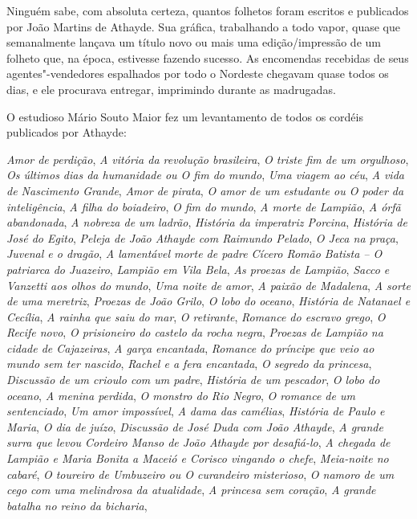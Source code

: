 Ninguém sabe, com absoluta certeza, quantos folhetos
foram escritos e publicados por João Martins de Athayde.
Sua gráfica, trabalhando a todo vapor, quase que
semanalmente lançava um título novo ou mais uma
edição/impressão de um folheto que, na época, estivesse
fazendo sucesso. As encomendas recebidas de seus agentes"-vendedores espalhados por todo o Nordeste chegavam quase todos os dias, e ele procurava entregar, imprimindo
durante as madrugadas.

O estudioso Mário Souto Maior fez um levantamento de todos os cordéis publicados por Athayde:

\textit{Amor de perdição}, \textit{A vitória da revolução brasileira}, \textit{O triste
fim de um orgulhoso}, \textit{Os últimos dias da humanidade ou O
fim do mundo}, \textit{Uma viagem ao céu}, \textit{A vida de Nascimento
Grande}, \textit{Amor de pirata}, \textit{O amor de um estudante ou O poder
da inteligência}, \textit{A filha do boiadeiro}, \textit{O fim do mundo}, \textit{A
morte de Lampião}, \textit{A órfã abandonada}, \textit{A nobreza de um
ladrão}, \textit{História da imperatriz Porcina}, \textit{História de José do
Egito}, \textit{Peleja de João Athayde com Raimundo Pelado}, \textit{O
Jeca na praça}, \textit{Juvenal e o dragão}, \textit{A lamentável morte de
padre Cícero Romão Batista -- O patriarca do Juazeiro},
\textit{Lampião em Vila Bela}, \textit{As proezas de Lampião}, \textit{Sacco e
Vanzetti aos olhos do mundo}, \textit{Uma noite de amor}, \textit{A paixão
de Madalena}, \textit{A sorte de uma meretriz}, \textit{Proezas de João
Grilo}, \textit{O lobo do oceano}, \textit{História de Natanael e Cecília}, \textit{A
rainha que saiu do mar}, \textit{O retirante}, \textit{Romance do escravo
grego}, \textit{O Recife novo}, \textit{O prisioneiro do castelo da rocha negra},
\textit{Proezas de Lampião na cidade de Cajazeiras}, \textit{A garça
encantada}, \textit{Romance do príncipe que veio ao mundo sem ter
nascido}, \textit{Rachel e a fera encantada}, \textit{O segredo da princesa},
\textit{Discussão de um crioulo com um padre}, \textit{História de um
pescador}, \textit{O lobo do oceano}, \textit{A menina perdida}, \textit{O monstro
do Rio Negro}, \textit{O romance de um sentenciado}, \textit{Um amor
impossível}, \textit{A dama das camélias}, \textit{História de Paulo e Maria},
\textit{O dia de juízo}, \textit{Discussão de José Duda com João Athayde},
\textit{A grande surra que levou Cordeiro Manso de João Athayde
por desafiá-lo}, \textit{A chegada de Lampião e Maria Bonita a
Maceió e Corisco vingando o chefe}, \textit{Meia-noite no cabaré}, \textit{O
toureiro de Umbuzeiro ou O curandeiro misterioso}, \textit{O
namoro de um cego com uma melindrosa da atualidade}, \textit{A
princesa sem coração}, \textit{A grande batalha no reino da bicharia},
